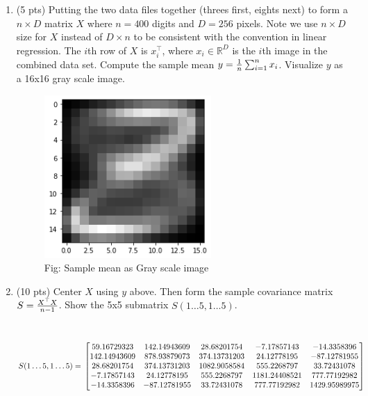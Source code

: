 \documentclass[a4paper]{article}
\theoremstyle{definition}
\def\R{\mathbb R}
\newenvironment{soln}{
    \leavevmode\color{blue}\ignorespaces
}{}
\begin{document}
\begin{enumerate}
\begin{soln}
\begin{figure}[h!]
\end{figure}

\end{soln}

\clearpage


\item (5 pts) Putting the two data files together (threes first, eights next) to form a $n \times D$ matrix $X$ where $n=400$ digits and $D=256$ pixels.  Note we use $n\times D$ size for $X$ instead of $D\times n$ to be consistent with the convention in linear regression.   The $i$th row of $X$ is $x_i^\top$, where $x_i \in \R^D$ is the $i$th image in the combined data set.
Compute the sample mean $y = {1\over n} \sum_{i=1}^n x_i$.
Visualize $y$ as a 16x16 gray scale image.


\begin{soln}
	
	\begin{figure}[h!]
	        \centering
	        \includegraphics[width=0.6\textwidth]{Ans_2.png} 
	        \captionsetup{labelformat=empty}
	        \caption{Fig: Sample mean as Gray scale image}
	        \label{fig:Sample mean as Gray scale image}
	\end{figure}

\end{soln}


\item (10 pts) Center $X$ using $y$ above.  Then form the sample covariance matrix $S={X^\top X \over n-1}$.
Show the 5x5 submatrix $S(1\ldots 5, 1 \ldots 5)$.

\begin{soln} \\
$$S(1\ldots 5, 1 \ldots 5)=\\
\begin{bmatrix}
59.16729323  & 142.14943609  & 28.68201754 & -7.17857143 & -14.3358396 \\
142.14943609 & 878.93879073  & 374.13731203 &  24.12778195 & -87.12781955 \\
28.68201754 & 374.13731203  & 1082.9058584  & 555.2268797  &  33.72431078 \\
-7.17857143  & 24.12778195  & 555.2268797 & 1181.24408521 & 777.77192982 \\
-14.3358396  & -87.12781955  & 33.72431078 & 777.77192982 & 1429.95989975
\end{bmatrix}
$$
\end{soln}



\end{enumerate}
\end{document}
